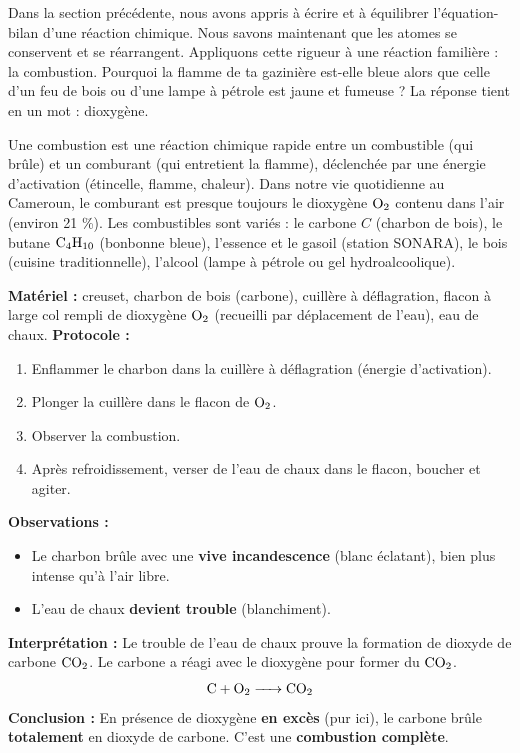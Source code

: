 \documentclass[11pt]{article}
\newcommand{\cle}[1]{{\popxbold\color{popdark}#1}}
\newcounter{popsec}
\newcounter{popsub}
\newcommand{\courssub}[1]{%
  \stepcounter{popsub}%
  \par\vspace{9pt}\noindent{\popxbold\fontsize{11.5}{13}\selectfont\color{popink}{\color{poporange}\thepopsec.\thepopsub}\hspace{6pt}#1}\par\nopagebreak\vspace{4pt}
}
\begin{document}
Dans la section précédente, nous avons appris à écrire et à équilibrer l'équation-bilan d'une réaction chimique. Nous savons maintenant que les atomes se conservent et se réarrangent. Appliquons cette rigueur à une réaction familière : la combustion. Pourquoi la flamme de ta gazinière est-elle bleue alors que celle d'un feu de bois ou d'une lampe à pétrole est jaune et fumeuse ? La réponse tient en un mot : \cle{dioxygène}.

\courssub{Rappel : c'est quoi, une combustion ?}

Une \cle{combustion} est une réaction chimique rapide entre un \cle{combustible} (qui brûle) et un \cle{comburant} (qui entretient la flamme), déclenchée par une \cle{énergie d'activation} (étincelle, flamme, chaleur). Dans notre vie quotidienne au Cameroun, le comburant est presque toujours le \cle{dioxygène} $\ce{O2}$ contenu dans l'air (environ 21 \%). Les combustibles sont variés : le \cle{carbone} $C$ (charbon de bois), le \cle{butane} $\ce{C4H10}$ (bonbonne bleue), l'\cle{essence} et le \cle{gasoil} (station SONARA), le \cle{bois} (cuisine traditionnelle), l'\cle{alcool} (lampe à pétrole ou gel hydroalcoolique).

\begin{experience}
\textbf{Matériel :} creuset, charbon de bois (carbone), cuillère à déflagration, flacon à large col rempli de dioxygène $\ce{O2}$ (recueilli par déplacement de l'eau), eau de chaux.
\textbf{Protocole :}
\begin{enumerate}
\item Enflammer le charbon dans la cuillère à déflagration (énergie d'activation).
\item Plonger la cuillère dans le flacon de $\ce{O2}$.
\item Observer la combustion.
\item Après refroidissement, verser de l'eau de chaux dans le flacon, boucher et agiter.
\end{enumerate}
\textbf{Observations :}
\begin{itemize}
\item Le charbon brûle avec une \textbf{vive incandescence} (blanc éclatant), bien plus intense qu'à l'air libre.
\item L'eau de chaux \textbf{devient trouble} (blanchiment).
\end{itemize}
\textbf{Interprétation :} Le trouble de l'eau de chaux prouve la formation de \cle{dioxyde de carbone} $\ce{CO2}$. Le carbone a réagi avec le dioxygène pour former du $\ce{CO2}$.
\[
\ce{C + O2 -> CO2}
\]
\textbf{Conclusion :} En présence de dioxygène \textbf{en excès} (pur ici), le carbone brûle \textbf{totalement} en dioxyde de carbone. C'est une \textbf{combustion complète}.
\end{experience}
\end{document}
